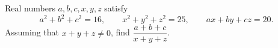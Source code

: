 Real numbers $a,b,c,x,y,z$ satisfy
\[a^2+b^2+c^2=16,\qquad x^2+y^2+z^2=25,\qquad ax+by+cz=20 .\]
Assuming that $x+y+z\ne0$, find $\dfrac{a+b+c}{x+y+z}$.
